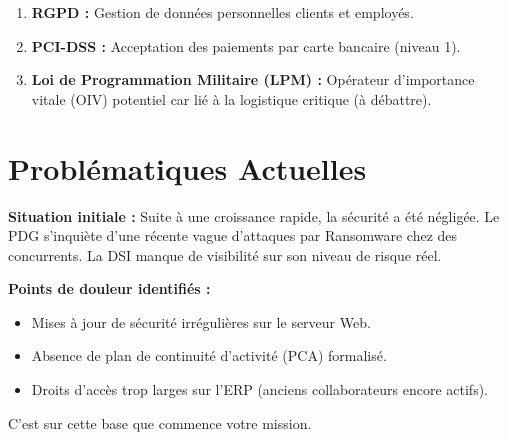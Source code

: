 \begin{enumerate}
    \item \textbf{RGPD :} Gestion de données personnelles clients et employés.
    \item \textbf{PCI-DSS :} Acceptation des paiements par carte bancaire (niveau 1).
    \item \textbf{Loi de Programmation Militaire (LPM) :} Opérateur d'importance vitale (OIV) potentiel car lié à la logistique critique (à débattre).
\end{enumerate}

\section{Problématiques Actuelles}

\begin{boxalert}
\textbf{Situation initiale :} Suite à une croissance rapide, la sécurité a été négligée. Le PDG s'inquiète d'une récente vague d'attaques par Ransomware chez des concurrents. La DSI manque de visibilité sur son niveau de risque réel.
\end{boxalert}

\textbf{Points de douleur identifiés :}
\begin{itemize}
    \item Mises à jour de sécurité irrégulières sur le serveur Web.
    \item Absence de plan de continuité d'activité (PCA) formalisé.
    \item Droits d'accès trop larges sur l'ERP (anciens collaborateurs encore actifs).
\end{itemize}

C'est sur cette base que commence votre mission.


